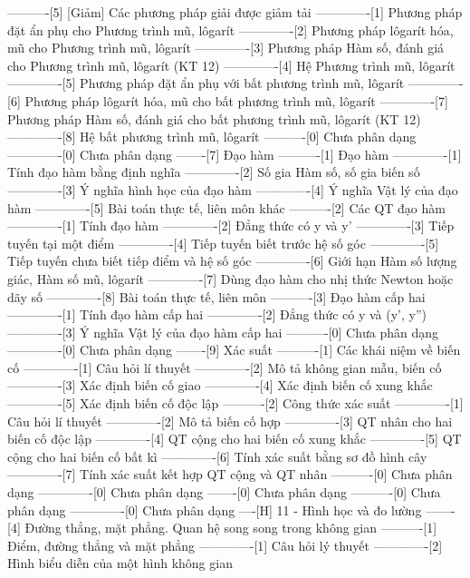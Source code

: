 ----------[5] [Giảm] Các phương pháp giải được giảm tải
-------------[1] Phương pháp đặt ẩn phụ cho Phương trình mũ, lôgarít
-------------[2] Phương pháp lôgarít hóa, mũ cho Phương trình mũ, lôgarít
-------------[3] Phương pháp Hàm số, đánh giá cho Phương trình mũ, lôgarít (KT 12)
-------------[4] Hệ Phương trình mũ, lôgarít
-------------[5] Phương pháp đặt ẩn phụ với bất phương trình mũ, lôgarít
-------------[6] Phương pháp lôgarít hóa, mũ cho bất phương trình mũ, lôgarít
-------------[7] Phương pháp Hàm số, đánh giá cho bất phương trình mũ, lôgarít (KT 12)
-------------[8] Hệ bất phương trình mũ, lôgarít
----------[0] Chưa phân dạng
-------------[0] Chưa phân dạng
-------[7] Đạo hàm
----------[1] Đạo hàm
-------------[1] Tính đạo hàm bằng định nghĩa
-------------[2] Số gia Hàm số, số gia biến số
-------------[3] Ý nghĩa hình học của đạo hàm
-------------[4] Ý nghĩa Vật lý của đạo hàm
-------------[5] Bài toán thực tế, liên môn khác
----------[2] Các QT đạo hàm
-------------[1] Tính đạo hàm
-------------[2] Đẳng thức có y và y'
-------------[3] Tiếp tuyến tại một điểm
-------------[4] Tiếp tuyến biết trước hệ số góc
-------------[5] Tiếp tuyến chưa biết tiếp điểm và hệ số góc
-------------[6] Giới hạn Hàm số lượng giác, Hàm số mũ, lôgarít
-------------[7] Dùng đạo hàm cho nhị thức Newton hoặc dãy số
-------------[8] Bài toán thực tế, liên môn
----------[3] Đạo hàm cấp hai
-------------[1] Tính đạo hàm cấp hai
-------------[2] Đẳng thức có y và (y', y'')
-------------[3] Ý nghĩa Vật lý của đạo hàm cấp hai
----------[0] Chưa phân dạng
-------------[0] Chưa phân dạng
-------[9] Xác suất
----------[1] Các khái niệm về biến cố
-------------[1] Câu hỏi lí thuyết
-------------[2] Mô tả không gian mẫu, biến cố
-------------[3] Xác định biến cố giao
-------------[4] Xác định biến cố xung khắc
-------------[5] Xác định biến cố độc lập
----------[2] Công thức xác suất
-------------[1] Câu hỏi lí thuyết
-------------[2] Mô tả biến cố hợp
-------------[3] QT nhân cho hai biến cố độc lập
-------------[4] QT cộng cho hai biến cố xung khắc
-------------[5] QT cộng cho hai biến cố bất kì
-------------[6] Tính xác suất bằng sơ đồ hình cây
-------------[7] Tính xác suất kết hợp QT cộng và QT nhân
----------[0] Chưa phân dạng
-------------[0] Chưa phân dạng
-------[0] Chưa phân dạng
----------[0] Chưa phân dạng
-------------[0] Chưa phân dạng
----[H] 11 - Hình học và đo lường
-------[4] Đường thẳng, mặt phẳng. Quan hệ song song trong không gian
----------[1] Điểm, đường thẳng và mặt phẳng
-------------[1] Câu hỏi lý thuyết
-------------[2] Hình biểu diễn của một hình không gian
